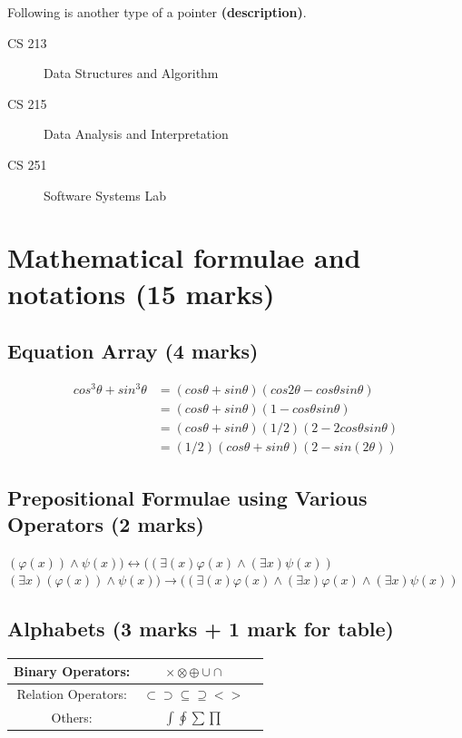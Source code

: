 \documentclass[english,12pt]{article}
\begin{document}
Following is another type of a pointer \textbf{(description)}.
\begin{description}
	\item[CS 213] Data Structures and Algorithm
	\item[CS 215] Data Analysis and Interpretation
	\item[CS 251] Software Systems Lab
\end{description}
\newpage
\section{Mathematical formulae and notations (15 marks)}
\subsection{Equation Array (4 marks)}
\begin{align}
cos^3\theta+sin^3\theta &=(cos\theta+sin\theta)(cos2\theta-cos\theta sin\theta)\label{eq1}\\
						&=(cos\theta+sin\theta)(1-cos\theta sin\theta)\\
						&=(cos\theta+sin\theta)(1/2)(2-2cos\theta sin\theta)\\
						&=(1/2)(cos\theta+sin\theta)(2-sin(2\theta))
\end{align}
\subsection{Prepositional Formulae using Various Operators (2 marks)}
$\displaystyle(\varphi(x))\wedge\psi(x))\longleftrightarrow((\exists(x)\varphi(x)\wedge(\exists x)\psi(x))$\\
$\displaystyle(\exists x)(\varphi(x))\wedge\psi(x))\longrightarrow((\exists(x)\varphi(x)\wedge(\exists x)\varphi(x)\wedge(\exists x)\psi(x))$
\subsection{Alphabets (3 marks + 1 mark for table)}
\begin{center}
\begin{tabular}{ |c|c|c| } 
 \hline
 Binary Operators: & $\times\otimes\oplus\cup\cap$ \\[2ex] 
 \hline
 Relation Operators: & $\subset\supset\subseteq\supseteq<>$ \\[2ex] 
 \hline
 Others: & $\int\oint\sum\prod$ \\[2ex]
 \hline
\end{tabular}
\end{center}
\end{document}
